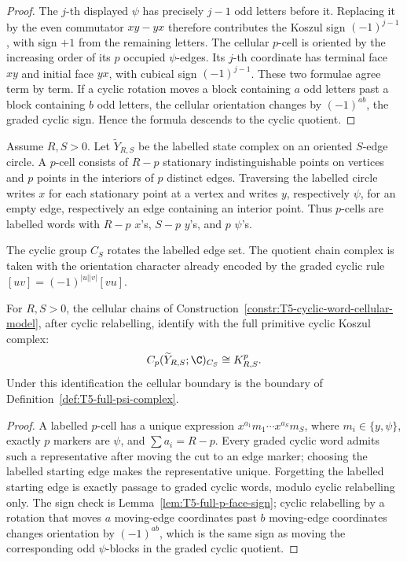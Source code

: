 \begin{proof}
  The \(j\)-th displayed \(\psi\) has precisely \(j-1\) odd letters before
  it.  Replacing it by the even commutator \(xy-yx\) therefore contributes
  the Koszul sign \((-1)^{j-1}\), with sign \(+1\) from the remaining
  letters.  The cellular
  \(p\)-cell is oriented by the increasing order of its \(p\) occupied
  \(\psi\)-edges.  Its \(j\)-th coordinate has terminal face \(xy\) and
  initial face \(yx\), with cubical sign \((-1)^{j-1}\).  These two
  formulae agree term by term.  If a cyclic rotation moves a block
  containing \(a\) odd letters past a block containing \(b\) odd letters,
  the cellular orientation changes by \((-1)^{ab}\), the graded cyclic
  sign.  Hence the formula descends to the cyclic quotient.
\end{proof}

\begin{constr}\label{constr:T5-cyclic-word-cellular-model}
  Assume \(R,S>0\).  Let \(\widetilde Y_{R,S}\) be the labelled state
  complex on an oriented \(S\)-edge circle.  A \(p\)-cell consists of
  \(R-p\) stationary indistinguishable points on vertices and \(p\)
  points in the interiors of \(p\) distinct edges.  Traversing the
  labelled circle writes \(x\) for each stationary point at a vertex and
  writes \(y\), respectively \(\psi\), for an empty edge, respectively an
  edge containing an interior point.  Thus \(p\)-cells are labelled words with
  \(R-p\) \(x\)'s, \(S-p\) \(y\)'s, and \(p\) \(\psi\)'s.

  The cyclic group \(C_S\) rotates the labelled edge set.  The quotient
  chain complex is taken with the orientation character already encoded
  by the graded cyclic rule
  \([uv]=(-1)^{|u||v|}[vu]\).
\end{constr}

\begin{lem}\label{lem:T5-cellular-chain-identification}
  For \(R,S>0\), the cellular chains of
  Construction~\ref{constr:T5-cyclic-word-cellular-model}, after cyclic
  relabelling, identify with the full primitive cyclic Koszul complex:
  \[
    C_p(\widetilde Y_{R,S};\C)_{C_S}\cong K^p_{R,S}.
  \]
  Under this identification the cellular boundary is the boundary of
  Definition~\ref{def:T5-full-psi-complex}.
\end{lem}

\begin{proof}
  A labelled \(p\)-cell has a unique expression
  \(x^{a_1}m_1\cdots x^{a_S}m_S\), where
  \(m_i\in\{y,\psi\}\), exactly \(p\) markers are \(\psi\), and
  \(\sum a_i=R-p\).  Every graded cyclic word admits such a representative
  after moving the cut to an edge marker; choosing the labelled starting
  edge makes the representative unique.  Forgetting the labelled starting
  edge is exactly passage to graded cyclic words, modulo cyclic
  relabelling only.  The sign check is
  Lemma~\ref{lem:T5-full-p-face-sign}; cyclic relabelling by a rotation
  that moves \(a\) moving-edge coordinates past \(b\) moving-edge
  coordinates changes orientation by \((-1)^{ab}\), which is the same
  sign as moving the corresponding odd \(\psi\)-blocks in the graded
  cyclic quotient.
\end{proof}

